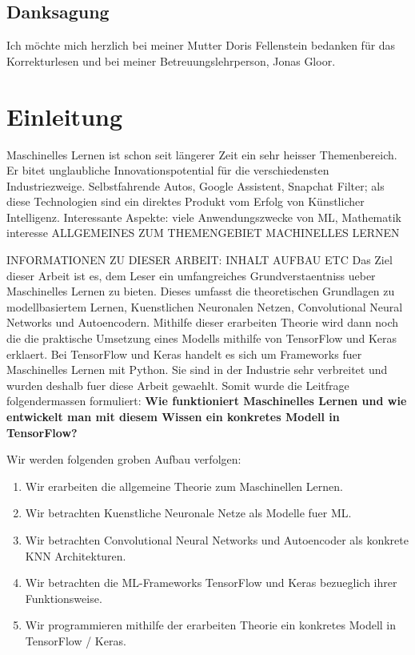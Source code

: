 \section*{Danksagung}
Ich möchte mich herzlich bei meiner Mutter Doris Fellenstein bedanken für das
Korrekturlesen und bei meiner Betreuungslehrperson, Jonas Gloor.


\chapter*{Einleitung}
Maschinelles Lernen ist schon seit längerer Zeit ein sehr heisser Themenbereich.
Er bitet unglaubliche Innovationspotential für die verschiedensten
Industriezweige. Selbstfahrende Autos, Google Assistent, Snapchat Filter; als
diese Technologien sind ein direktes Produkt vom Erfolg von Künstlicher
Intelligenz.
Interessante Aspekte: viele Anwendungszwecke von ML, Mathematik interesse
ALLGEMEINES ZUM THEMENGEBIET MACHINELLES LERNEN

INFORMATIONEN ZU DIESER ARBEIT: INHALT AUFBAU ETC
Das Ziel dieser Arbeit ist es, dem Leser ein umfangreiches Grundverstaentniss
ueber Maschinelles Lernen zu bieten. Dieses umfasst die theoretischen Grundlagen
zu modellbasiertem Lernen, Kuenstlichen Neuronalen Netzen, Convolutional Neural
Networks und Autoencodern. Mithilfe dieser erarbeiten Theorie wird dann noch die
die praktische Umsetzung eines Modells mithilfe von TensorFlow und Keras
erklaert. Bei TensorFlow und Keras handelt es sich um Frameworks fuer
Maschinelles Lernen mit Python. Sie sind in der Industrie sehr verbreitet und
wurden deshalb fuer diese Arbeit gewaehlt.
\para{}
Somit wurde die Leitfrage folgendermassen formuliert:
\textbf{Wie funktioniert Maschinelles Lernen und wie entwickelt man mit diesem
  Wissen ein konkretes Modell in TensorFlow?}
\para{}

Wir werden folgenden groben Aufbau verfolgen:

\begin{enumerate}
  \item{Wir erarbeiten die allgemeine Theorie zum Maschinellen Lernen.}
  \item{Wir betrachten Kuenstliche Neuronale Netze als Modelle fuer ML.}
  \item{Wir betrachten Convolutional Neural Networks und Autoencoder als
      konkrete KNN Architekturen.}
  \item{Wir betrachten die ML-Frameworks TensorFlow und Keras bezueglich ihrer Funktionsweise.}
  \item{Wir programmieren mithilfe der erarbeiten Theorie ein konkretes Modell
      in TensorFlow / Keras.}
\end{enumerate}

